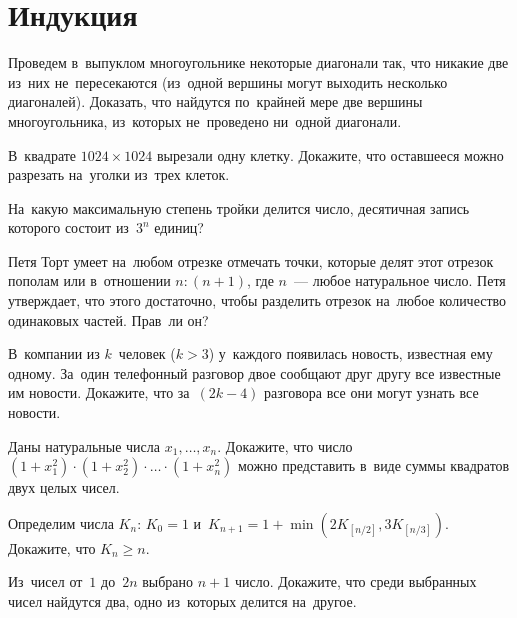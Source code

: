 
\section*{Индукция}


\begin{problems}

\item
Проведем в~выпуклом многоугольнике некоторые диагонали так, что никакие две
из~них не~пересекаются (из~одной вершины могут выходить несколько диагоналей).
Доказать, что найдутся по~крайней мере две вершины многоугольника, из~которых
не~проведено ни~одной диагонали.

\item
В~квадрате $1024 \times 1024$ вырезали одну клетку.
Докажите, что оставшееся можно разрезать на~уголки из~трех клеток.

\item
На~какую максимальную степень тройки делится число, десятичная запись которого
состоит из~$3^n$ единиц?

\item
Петя Торт умеет на~любом отрезке отмечать точки, которые делят этот отрезок
пополам или в~отношении $n : (n + 1)$, где $n$~--- любое натуральное число.
Петя утверждает, что этого достаточно, чтобы разделить отрезок на~любое
количество одинаковых частей.
Прав~ли он?

\item
В~компании из $k$~человек ($k > 3$) у~каждого появилась новость, известная ему
одному.
За~один телефонный разговор двое сообщают друг другу все известные им новости.
Докажите, что за~$(2 k - 4)$ разговора все они могут узнать все новости.

\item
Даны натуральные числа $x_1, \dots, x_n$.
Докажите, что число
\(
    ( 1 + x_1^2 ) \cdot
    ( 1 + x_2^2 ) \cdot
    \ldots \cdot
    ( 1 + x_n^2 )
\)
можно представить в~виде суммы квадратов двух целых чисел.

\item
Определим числа $K_n$:
$K_0 = 1$ и~$K_{n + 1} = 1 + \min (2 K_{[n / 2]}, 3K_{[n / 3]})$.
Докажите, что $K_n \geq n$.

\item
Из~чисел от~$1$ до~$2n$ выбрано $n + 1$ число.
Докажите, что среди выбранных чисел найдутся два, одно из~которых делится
на~другое.


\end{problems}
